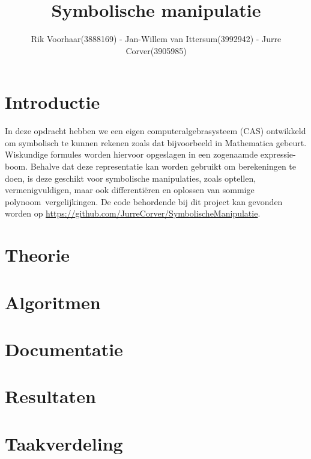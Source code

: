 \documentclass[a4paper]{article}
\title{Symbolische manipulatie}
\author{Rik Voorhaar(3888169) - Jan-Willem van Ittersum(3992942) - Jurre Corver(3905985)}
\begin{document}
\maketitle
\clearpage


\section{Introductie}
In deze opdracht hebben we een eigen computeralgebrasysteem (CAS) ontwikkeld om symbolisch te kunnen rekenen zoals dat bijvoorbeeld in Mathematica gebeurt. Wiskundige formules worden hiervoor opgeslagen in een zogenaamde expressie-boom. Behalve dat deze representatie kan worden gebruikt om berekeningen te doen, is deze geschikt voor symbolische manipulaties, zoals optellen, vermenigvuldigen, maar ook differenti\"eren en oplossen van sommige polynoom~vergelijkingen. De code behordende bij dit project kan gevonden worden op \url{https://github.com/JurreCorver/SymbolischeManipulatie}.


\section{Theorie}


\section{Algoritmen}



\section{Documentatie}

\section{Resultaten}

\section{Taakverdeling}




\end{document}
